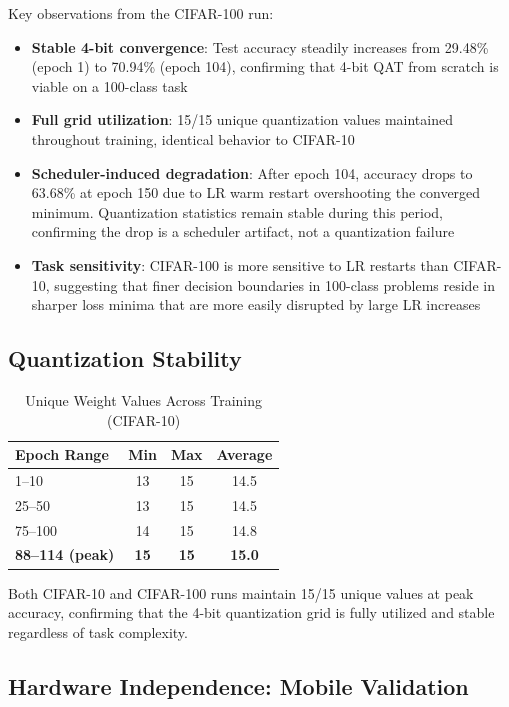 \documentclass[conference]{IEEEtran}
\begin{document}
Key observations from the CIFAR-100 run:
\begin{itemize}
    \item \textbf{Stable 4-bit convergence}: Test accuracy steadily increases from 29.48\% (epoch 1) to 70.94\% (epoch 104), confirming that 4-bit QAT from scratch is viable on a 100-class task
    \item \textbf{Full grid utilization}: 15/15 unique quantization values maintained throughout training, identical behavior to CIFAR-10
    \item \textbf{Scheduler-induced degradation}: After epoch 104, accuracy drops to 63.68\% at epoch 150 due to LR warm restart overshooting the converged minimum. Quantization statistics remain stable during this period, confirming the drop is a scheduler artifact, not a quantization failure
    \item \textbf{Task sensitivity}: CIFAR-100 is more sensitive to LR restarts than CIFAR-10, suggesting that finer decision boundaries in 100-class problems reside in sharper loss minima that are more easily disrupted by large LR increases
\end{itemize}

\subsection{Quantization Stability}

\begin{table}[h]
\centering
\caption{Unique Weight Values Across Training (CIFAR-10)}
\label{tab:unique_values}
\begin{tabular}{@{}lccc@{}}
\toprule
\textbf{Epoch Range} & \textbf{Min} & \textbf{Max} & \textbf{Average} \\
\midrule
1--10   & 13 & 15 & 14.5 \\
25--50  & 13 & 15 & 14.5 \\
75--100 & 14 & 15 & 14.8 \\
\textbf{88--114 (peak)} & \textbf{15} & \textbf{15} & \textbf{15.0} \\
\bottomrule
\end{tabular}
\end{table}

Both CIFAR-10 and CIFAR-100 runs maintain 15/15 unique values at peak accuracy, confirming that the 4-bit quantization grid is fully utilized and stable regardless of task complexity.

\subsection{Hardware Independence: Mobile Validation}
\end{document}
